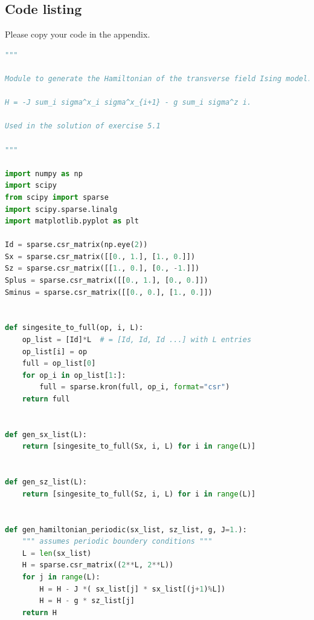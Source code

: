 \documentclass[reprint,amsmath,amssymb,aps,prb]{revtex4-2}
\begin{document}
\begin{widetext}
\section{Code listing} \label{app:codes}
Please copy your code in the appendix.
\begin{lstlisting}[language=Python]
"""

Module to generate the Hamiltonian of the transverse field Ising model.

H = -J sum_i sigma^x_i sigma^x_{i+1} - g sum_i sigma^z i.

Used in the solution of exercise 5.1

"""

import numpy as np
import scipy
from scipy import sparse
import scipy.sparse.linalg
import matplotlib.pyplot as plt

Id = sparse.csr_matrix(np.eye(2))
Sx = sparse.csr_matrix([[0., 1.], [1., 0.]])
Sz = sparse.csr_matrix([[1., 0.], [0., -1.]])
Splus = sparse.csr_matrix([[0., 1.], [0., 0.]])
Sminus = sparse.csr_matrix([[0., 0.], [1., 0.]])


def singesite_to_full(op, i, L):
    op_list = [Id]*L  # = [Id, Id, Id ...] with L entries
    op_list[i] = op
    full = op_list[0]
    for op_i in op_list[1:]:
        full = sparse.kron(full, op_i, format="csr")
    return full


def gen_sx_list(L):
    return [singesite_to_full(Sx, i, L) for i in range(L)]


def gen_sz_list(L):
    return [singesite_to_full(Sz, i, L) for i in range(L)]


def gen_hamiltonian_periodic(sx_list, sz_list, g, J=1.):
    """ assumes periodic boundery conditions """
    L = len(sx_list)
    H = sparse.csr_matrix((2**L, 2**L))
    for j in range(L):
        H = H - J *( sx_list[j] * sx_list[(j+1)%L])
        H = H - g * sz_list[j]
    return H
\end{lstlisting}
\end{widetext}
\end{document}
